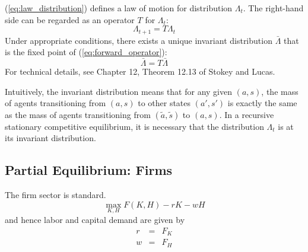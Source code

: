 \documentclass[12pt]{article}
\begin{document}
(\ref{eq:law_distribution}) defines a law of motion for distribution $\Lambda_t$. The right-hand side can be regarded as an operator $T$ for $\Lambda_t$:
\begin{equation} \label{eq:forward_operator}
	\Lambda_{t+1} = T \Lambda_t
\end{equation}
Under appropriate conditions, there exists a unique invariant distribution $\bar{\Lambda}$ that is the fixed point of (\ref{eq:forward_operator}):
\begin{equation}
	\bar{\Lambda} = T \bar{\Lambda}
\end{equation}  
For technical details, see Chapter 12, Theorem 12.13 of Stokey and Lucas.

Intuitively, the invariant distribution means that for any given $(a,s)$, the mass of agents transitioning from $(a,s)$ to other states $(a',s')$ is exactly the same as the mass of agents transitioning from $(\tilde{a}, \tilde{s})$ to $(a,s)$. In a recursive stationary competitive equilibrium, it is necessary that the distribution $\Lambda_t$ is at its invariant distribution.

\subsection{Partial Equilibrium: Firms}
The firm sector is standard. 
\begin{equation}
	\max_{K,H} F(K,H) - rK - wH
\end{equation}
and hence labor and capital demand are given by
\begin{eqnarray}
	r &=& F_K \label{eq:foc_k}\\
	w &=& F_H \label{eq:foc_h}
\end{eqnarray}
\end{document}
